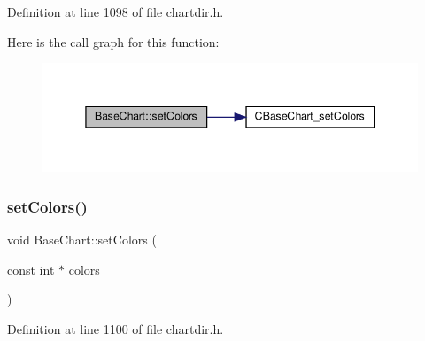 Definition at line 1098 of file chartdir.\+h.

Here is the call graph for this function\+:
\nopagebreak
\begin{figure}[H]
\begin{center}
\leavevmode
\includegraphics[width=345pt]{class_base_chart_a97a8d359493d86900dd2dd577b65c593_cgraph}
\end{center}
\end{figure}
\mbox{\label{class_base_chart_a723ac51f36ac8d8ed451a24665935229}} 
\subsubsection{\texorpdfstring{set\+Colors()}{setColors()}\hspace{0.1cm}{\footnotesize\ttfamily [3/4]}}
{\footnotesize\ttfamily void Base\+Chart\+::set\+Colors (\begin{DoxyParamCaption}\item[{const int $\ast$}]{colors }\end{DoxyParamCaption})\hspace{0.3cm}{\ttfamily [inline]}}



Definition at line 1100 of file chartdir.\+h.

